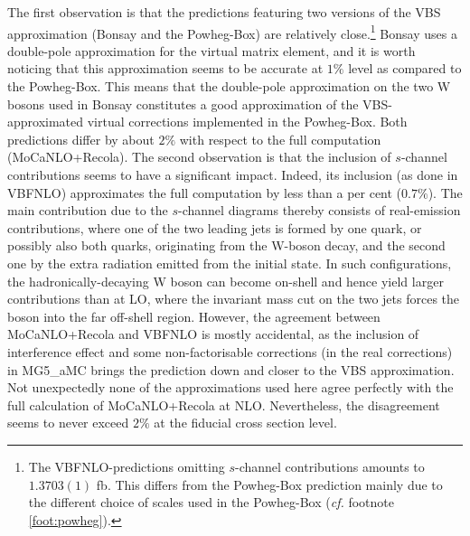 The first observation is that the predictions featuring two versions
of the VBS approximation ({\sc Bonsay} and the {\sc Powheg-Box}) are
relatively close.\footnote{The {\sc VBFNLO}-predictions omitting
$s$-channel contributions amounts to $1.3703(1)$ fb. This differs from
the {\sc Powheg-Box} prediction mainly due to the different choice of
scales used in the {\sc Powheg-Box} (\emph{cf.}
footnote \ref{foot:powheg}).} {\sc Bonsay} uses a double-pole
approximation for the virtual matrix element, and it is worth noticing
that this approximation seems to be accurate at $1\%$ level as
compared to the {\sc Powheg-Box}. This means that the double-pole
approximation on the two W bosons used in {\sc Bonsay} constitutes a
good approximation of the VBS-approxi\-mated virtual corrections
implemented in the {\sc Powheg-Box}.  Both predictions differ by about
$2\%$ with respect to the full computation ({\sc MoCaNLO+Recola}).
The second observation is that the inclusion of $s$-channel
contributions seems to have a significant impact.  Indeed, its
inclusion (as done in {\sc VBFNLO}) approximates the full computation
by less than a per cent ($0.7\%$). The main contribution due to 
the $s$-channel diagrams thereby consists of real-emission
contributions, where one of the two leading jets is formed by one
quark, or possibly also both quarks, originating from the W-boson decay,
and the second one by the extra radiation emitted from the initial
state. In such configurations, the hadronically-decaying W boson can
become on-shell and hence yield larger contributions than at LO, where
the invariant mass cut on the two jets forces the boson into the far
off-shell region.
However, the agreement between {\sc MoCaNLO+Recola} and {\sc VBFNLO} is mostly accidental, as the inclusion of interference effect and some non-factorisable corrections (in the real corrections) in {\sc MG5\_aMC} brings the prediction down and closer to the VBS approximation.
Not unexpectedly none of the approximations used here agree perfectly with the full calculation of {\sc MoCaNLO\-+Recola} at NLO.
Nevertheless, the disagreement seems to never exceed $2\%$ at the fiducial cross section level.

